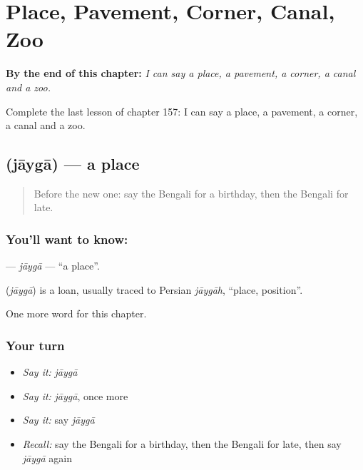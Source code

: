 
\chapter{Place, Pavement, Corner, Canal, Zoo}
\label{ch:bn-place-pavement-corner-canal-zoo}

\begin{chapteropening}
\textbf{By the end of this chapter:} \emph{I can say a place, a pavement, a corner, a canal and a zoo.}

Complete the last lesson of chapter 157: I can say a place, a pavement, a corner, a canal and a zoo.
\end{chapteropening}

\section[\texorpdfstring{\bn{জায়গা} (jāygā)}{জায়গা (jāygā)}]{ (jāygā) — a place}

\label{lesson:BN-C157-jayga}



\begin{quote}
Before the new one: say the Bengali for a birthday, then the Bengali for late.
\end{quote}

\subsection*{You'll want to know: }
\textbf{} — \emph{jāygā} — \textquotedblleft{}a place\textquotedblright{}.

\begin{cousinweb}
\textbf{} (\emph{jāygā}) is a loan, usually traced to Persian \emph{jāygāh}, \textquotedblleft{}place, position\textquotedblright{}.
\end{cousinweb}

\begin{grammarlens}[title={What you've built}]
One more word for this chapter.
\end{grammarlens}

\subsection*{Your turn}
\begin{itemize}
\raggedright
  \item \emph{Say it:} \emph{jāygā}
  \item \emph{Say it:} \emph{jāygā}, once more
  \item \emph{Say it:} say \emph{jāygā}
  \item \emph{Recall:} say the Bengali for a birthday, then the Bengali for late, then say \emph{jāygā} again
\end{itemize}

